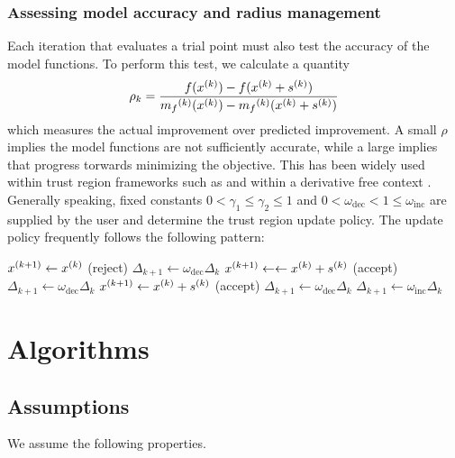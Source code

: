 \subsubsection{Assessing model accuracy and radius management}
Each iteration that evaluates a trial point must also test the accuracy of the model functions.
To perform this test, we calculate a quantity
\begin{equation}
\label{rho}
\rho_k = \frac{f({x}^{(k)}) - f({x}^{(k)}+{s}^{(k)})}{{{m}_f}^{(k)}({x}^{(k)}) - {{m}_f}^{(k)}({x}^{(k)}+{s}^{(k)})}
\end{equation}
which measures the actual improvement over predicted improvement.
A small $\rho$ implies the model functions are not sufficiently accurate, while a large implies that progress torwards minimizing the objective.
This has been widely used within trust region frameworks such as \cite{Conn:2000:TM:357813} and within a derivative free context \cite{DUMMY:intro_book}.
Generally speaking, fixed constants $0 < \gamma_1 \le \gamma_2 \le 1$ and $0 < \omega_{\text{dec}} < 1 \le \omega_{\text{inc}}$ are supplied by the user and determine the trust region update policy.
The update policy frequently follows the following pattern:

\begin{algorithmic}
    \State ${x}^{(k+1)} \gets {x}^{(k)}$ (reject)
    \State $\Delta_{k+1} \gets \omega_{\text{dec}} \Delta_k$
    \State ${x}^{(k+1)}\gets \gets {x}^{(k)} + {s}^{(k)}$ (accept)
    \State $\Delta_{k+1} \gets \omega_{\text{dec}} \Delta_k$
    \State ${x}^{(k+1)} \gets {x}^{(k)} + {s}^{(k)}$ (accept)
    \If
        \State $\Delta_{k+1} \gets \omega_{\text{dec}} \Delta_k$
    \Else
        \State $\Delta_{k+1} \gets \omega_{\text{inc}} \Delta_k$
    \EndIf
\EndIf
\end{algorithmic}




\section{Algorithms}

\subsection{Assumptions}

We assume the following properties.

